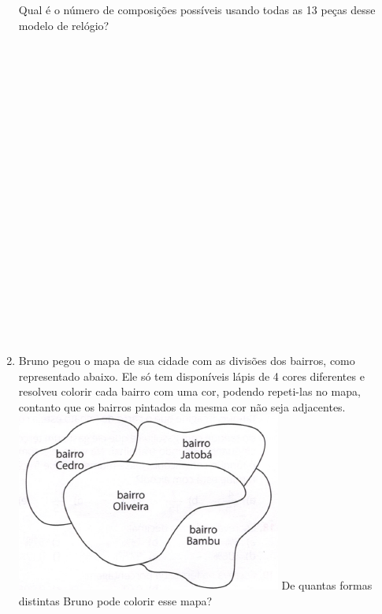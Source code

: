 \documentclass[a4paper,14pt]{article}
\begin{document}
\begin{multicols}{2}
\begin{enumerate}
			Qual é o número de composições possíveis usando todas as 13 peças desse modelo de relógio? \\\\\\\\\\\\\\\\\\\\\\\\\\\\\\\\\\\\\\\\\\
			\item Bruno pegou o mapa de sua cidade com as divisões dos bairros, como representado abaixo. Ele só tem disponíveis lápis de 4 cores diferentes e resolveu colorir cada bairro com uma cor, podendo repeti-las no mapa, contanto que os bairros pintados da mesma cor não seja adjacentes. \\
			\includegraphics[width=1\linewidth]{6FMA112_imagens/imagem3}
			De quantas formas distintas Bruno pode colorir esse mapa?
		\end{enumerate}

\end{multicols}
\end{document}
